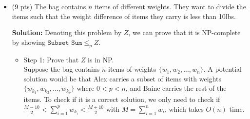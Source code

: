 \documentclass{article}
\begin{document}
\begin{itemize}
\begin{tcolorbox}
\begin{itemize}
\item Step 3: Prove that $\texttt{Subset Sum} \leq_p  Y$.
\begin{itemize}
\item Reduction: given an instance $(w_1, w_2, ..., w_n, W)$ of \texttt{Subset Sum}, we can create an instance of $Y$ as this: the bag contains $n+1$ items of weights $\{w_1, w_2, ..., w_n, w_{n+1}\}$ with $$w_{n+1} = \sum_{i=1}^n w_i - 2W.$$ We will show that if the  \texttt{Subset Sum} problem has a solution $\{w_{k_1}, w_{k_2}, ..., w_{k_p}\}$, then we can divide $n+1$ items of weights $\{w_1, w_2, ..., w_n, w_{n+1}\}$ evenly by taking one part as $\{w_{k_1}, w_{k_2}, ..., w_{k_p}, w_{n+1}\}$, and the rest as the other part.
\item "$\Rightarrow$" If $\{w_{k_1}, w_{k_2}, ..., w_{k_p} \}$ is a solution to the \texttt{Subset Sum} problem, i.e., $\sum_{i=1}^p w_{k_i} = W$. Then we have $$\sum_{i=1}^p w_{k_i} + w_{n+1} = W + (\sum_{i=1}^n w_i - 2W) = \sum_{i=1}^n w_i - W = \frac{\sum_{i=1}^n w_i + w_{n+1}}{2}.$$ So $\{w_{k_1}, w_{k_2}, ..., w_{k_p}, w_{n+1}\}$ is a solution to our problem $Y$. 
\item "$\Leftarrow$" If $\{w_{k_1}, w_{k_2}, ..., w_{k_p}, w_{n+1}\}$ is a solution to our problem $Y$, then $$\sum_{i=1}^p w_{k_i} + w_{n+1} =  \frac{\sum_{i=1}^n w_i + w_{n+1}}{2}.$$ So $$\sum_{i=1}^p w_{k_i} =  \frac{\sum_{i=1}^n w_i + w_{n+1}}{2} - w_{n+1} =   \frac{\sum_{i=1}^n w_i - w_{n+1}}{2} = W.$$ This proved that $\{w_{k_1}, w_{k_2}, ..., w_{k_p} \}$ is a solution to the \texttt{Subset Sum} problem.
\end{itemize}
\end{itemize}
Therefore, $\texttt{Subset Sum} \leq_p  Y$ and $Y$ is NP-complete.
\end{tcolorbox}
\newpage
	\item (9 pts) The bag contains $n$ items of different weights. They want to divide the items such that the weight difference of items they carry is less than 10lbs. 
\begin{tcolorbox}
{\bf Solution:} Denoting this problem by $Z$, we can prove that it is NP-complete by showing $\texttt{Subset Sum} \leq_p  Z$.
\begin{itemize}
\item Step 1: Prove that $Z$ is in NP. \\
Suppose the bag contains $n$ items of weights $\{w_1, w_2, ..., w_n\}$. A potential solution would be that Alex carries a subset of items with weights $\{w_{k_1}, w_{k_2}, ..., w_{k_p} \}$ where $0 < p < n$, and Baine carries the rest of the items. To check if it is a correct solution, we only need to check if $\frac {M- 10 }{2} < \sum_{i=1}^p w_{k_i} < \frac {M+ 10 }{2}$ with $M = \sum_{i=1}^n w_i $, which takes $O(n)$ time.

\end{itemize}
\end{tcolorbox}
\end{itemize}
\end{document}
